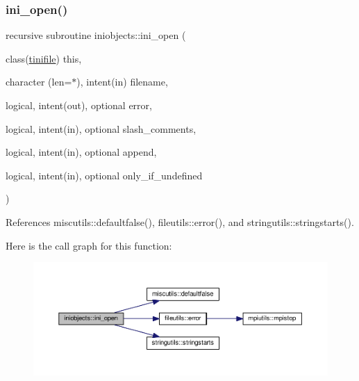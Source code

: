 \subsubsection{\texorpdfstring{ini\+\_\+open()}{ini\_open()}}
{\footnotesize\ttfamily recursive subroutine iniobjects\+::ini\+\_\+open (\begin{DoxyParamCaption}\item[{class(\mbox{\hyperlink{structiniobjects_1_1tinifile}{tinifile}})}]{this,  }\item[{character (len=$\ast$), intent(in)}]{filename,  }\item[{logical, intent(out), optional}]{error,  }\item[{logical, intent(in), optional}]{slash\+\_\+comments,  }\item[{logical, intent(in), optional}]{append,  }\item[{logical, intent(in), optional}]{only\+\_\+if\+\_\+undefined }\end{DoxyParamCaption})\hspace{0.3cm}{\ttfamily [private]}}



References miscutils\+::defaultfalse(), fileutils\+::error(), and stringutils\+::stringstarts().

Here is the call graph for this function\+:
\nopagebreak
\begin{figure}[H]
\begin{center}
\leavevmode
\includegraphics[width=350pt]{namespaceiniobjects_a74dae844438b97709e8a7fb1c44d87e9_cgraph}
\end{center}
\end{figure}
\mbox{\label{namespaceiniobjects_acc50d404fe26696d6c641fabb4ae033f}} 
